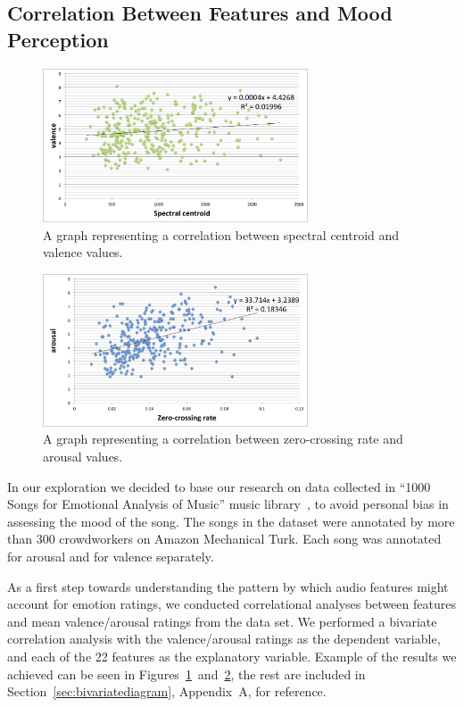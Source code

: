 \newpage

\subsection{Correlation Between Features and Mood Perception}
\vspace{10pt}

\begin{figure}[b]
	\centering
   \includegraphics[width=0.7\textwidth]{Figures/spectralcentroid-valence}
\caption{A graph representing a correlation between spectral centroid and valence values.}
\label{fig:bivariate-valence}
\end{figure}


\begin{figure}[b]
	\centering
   \includegraphics[width=0.7\textwidth]{Figures/zerocrossing-arousal}
 \caption{A graph representing a correlation between zero-crossing rate and arousal values.}
\label{fig:bivariate-arousal}
\end{figure}


In our exploration we decided to base our research on data collected in ``1000 Songs for Emotional Analysis of Music'' music library~\cite{1000songs}, to avoid personal bias in assessing the mood of the song. The songs in the dataset were annotated by more than 300 crowdworkers on Amazon Mechanical Turk. Each song was annotated for arousal and for valence separately.

As a first step towards understanding the pattern by which audio features might account for emotion ratings, we conducted correlational analyses between features and mean valence/arousal ratings from the data set. We performed a bivariate correlation analysis with the valence/arousal ratings as the dependent variable, and each of the 22 features as the explanatory variable. Example of the results we achieved can be seen in Figures~\ref{fig:bivariate-valence}~and~\ref{fig:bivariate-arousal}, the rest are included in Section~\ref{sec:bivariatediagram}, Appendix~A, for reference. 

